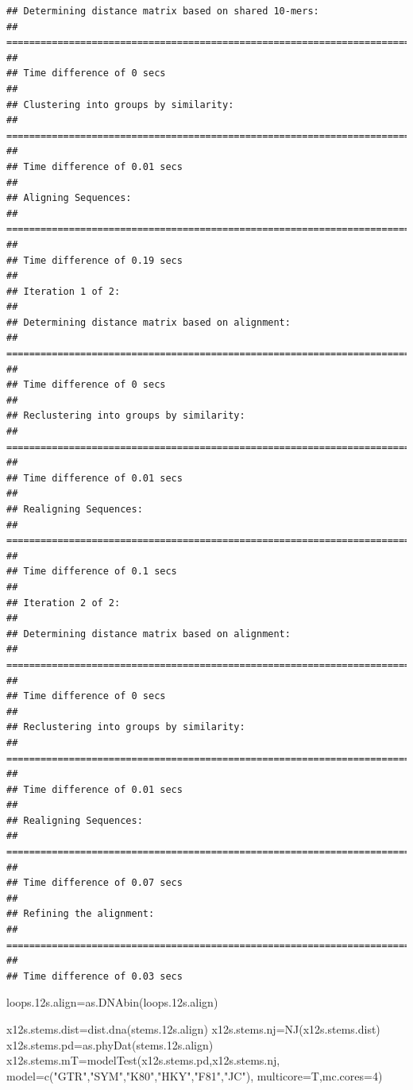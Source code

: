 \documentclass[
]{article}
\newenvironment{Shaded}{\begin{snugshade}}{\end{snugshade}}
\newcommand{\AttributeTok}[1]{\textcolor[rgb]{0.77,0.63,0.00}{#1}}
\newcommand{\DecValTok}[1]{\textcolor[rgb]{0.00,0.00,0.81}{#1}}
\newcommand{\FloatTok}[1]{\textcolor[rgb]{0.00,0.00,0.81}{#1}}
\newcommand{\FunctionTok}[1]{\textcolor[rgb]{0.00,0.00,0.00}{#1}}
\newcommand{\NormalTok}[1]{#1}
\newcommand{\OtherTok}[1]{\textcolor[rgb]{0.56,0.35,0.01}{#1}}
\newcommand{\StringTok}[1]{\textcolor[rgb]{0.31,0.60,0.02}{#1}}
\begin{document}
\begin{verbatim}
## Determining distance matrix based on shared 10-mers:
## ================================================================================
## 
## Time difference of 0 secs
## 
## Clustering into groups by similarity:
## ================================================================================
## 
## Time difference of 0.01 secs
## 
## Aligning Sequences:
## ================================================================================
## 
## Time difference of 0.19 secs
## 
## Iteration 1 of 2:
## 
## Determining distance matrix based on alignment:
## ================================================================================
## 
## Time difference of 0 secs
## 
## Reclustering into groups by similarity:
## ================================================================================
## 
## Time difference of 0.01 secs
## 
## Realigning Sequences:
## ================================================================================
## 
## Time difference of 0.1 secs
## 
## Iteration 2 of 2:
## 
## Determining distance matrix based on alignment:
## ================================================================================
## 
## Time difference of 0 secs
## 
## Reclustering into groups by similarity:
## ================================================================================
## 
## Time difference of 0.01 secs
## 
## Realigning Sequences:
## ================================================================================
## 
## Time difference of 0.07 secs
## 
## Refining the alignment:
## ================================================================================
## 
## Time difference of 0.03 secs
\end{verbatim}

\begin{Shaded}
\begin{Highlighting}[]
\NormalTok{loops}\FloatTok{.12}\NormalTok{s.align}\OtherTok{=}\FunctionTok{as.DNAbin}\NormalTok{(loops}\FloatTok{.12}\NormalTok{s.align)}
\end{Highlighting}
\end{Shaded}

\begin{Shaded}
\begin{Highlighting}[]
\NormalTok{x12s.stems.dist}\OtherTok{=}\FunctionTok{dist.dna}\NormalTok{(stems}\FloatTok{.12}\NormalTok{s.align)}
\NormalTok{x12s.stems.nj}\OtherTok{=}\FunctionTok{NJ}\NormalTok{(x12s.stems.dist)}
\NormalTok{x12s.stems.pd}\OtherTok{=}\FunctionTok{as.phyDat}\NormalTok{(stems}\FloatTok{.12}\NormalTok{s.align)}
\NormalTok{x12s.stems.mT}\OtherTok{=}\FunctionTok{modelTest}\NormalTok{(x12s.stems.pd,x12s.stems.nj,}
                        \AttributeTok{model=}\FunctionTok{c}\NormalTok{(}\StringTok{"GTR"}\NormalTok{,}\StringTok{"SYM"}\NormalTok{,}\StringTok{"K80"}\NormalTok{,}\StringTok{"HKY"}\NormalTok{,}\StringTok{"F81"}\NormalTok{,}\StringTok{"JC"}\NormalTok{),}
                        \AttributeTok{multicore=}\NormalTok{T,}\AttributeTok{mc.cores=}\DecValTok{4}\NormalTok{)}
\end{Highlighting}
\end{Shaded}
\end{document}
